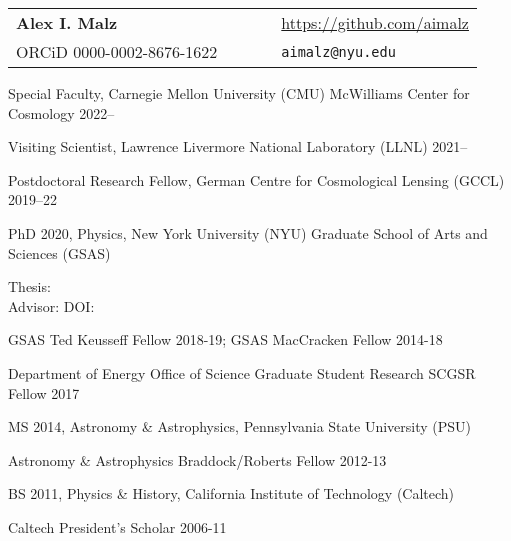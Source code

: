 \documentclass[11pt,letterpaper]{article}
\begin{document}
\sloppy\sloppypar\raggedbottom\frenchspacing
\setlength{\tabcolsep}{0.55cm}
\begin{tabular}{lllll}
\noindent\textbf{\Large Alex I. Malz}            & & %
& & {\url{https://github.com/aimalz}} \\%
\noindent ORCiD 0000-0002-8676-1622 & & %
& & \texttt{aimalz@nyu.edu}    
\end{tabular}\vspace{1ex} 

\begin{list}{}{\malzlist}
	\item Special Faculty, Carnegie Mellon University (CMU) McWilliams Center for Cosmology 2022--\\
	\item Visiting Scientist, Lawrence Livermore National Laboratory (LLNL) 2021--
	\item Postdoctoral Research Fellow, German Centre for Cosmological Lensing (GCCL) 2019--22
\end{list}%

\begin{list}{}{\malzlist}
\item
PhD 2020, Physics, New York University (NYU) Graduate School of Arts and Sciences (GSAS)
	\begin{list}{}{\malzlist}
		\item Thesis:  \\
		Advisor:  DOI: 
		\item GSAS Ted Keusseff Fellow 2018-19; GSAS MacCracken Fellow 2014-18
		\item
		Department of Energy Office of Science Graduate Student Research SCGSR Fellow 2017
	\end{list}{}
\item
MS 2014, Astronomy \& Astrophysics, Pennsylvania State University (PSU)
	\begin{list}{}{\malzlist}
		\item Astronomy \& Astrophysics Braddock/Roberts Fellow 2012-13
	\end{list}
\item
BS 2011, Physics \& History, California Institute of Technology (Caltech)
	\begin{list}{}{\malzlist}
		\item Caltech President's Scholar 2006-11
	\end{list}
\end{list}
\end{document}
